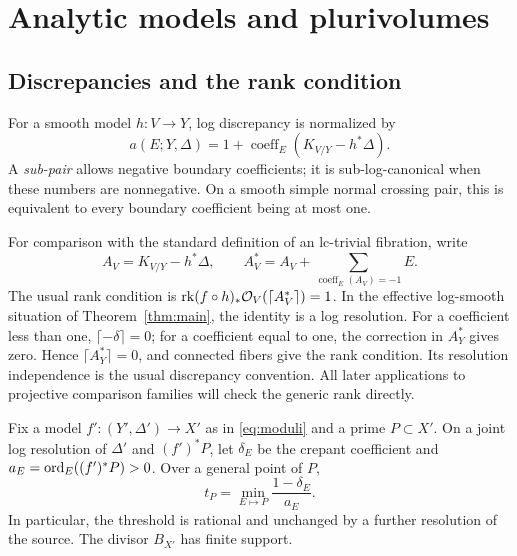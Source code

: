 \section{Analytic models and plurivolumes}\label{sec:prelim}

\subsection{Discrepancies and the rank condition}

For a smooth model \(h:V\to Y\), log discrepancy is normalized by
\[
 a(E;Y,\Delta)
 =1+\operatorname{coeff}_E(K_{V/Y}-h^*\Delta).
\]
A \emph{sub-pair} allows negative boundary coefficients; it is
sub-log-canonical when these numbers are nonnegative.
On a smooth simple normal crossing pair, this is equivalent to every
boundary coefficient being at most one.

For comparison with the standard definition of an lc-trivial
fibration, write
\[
 A_V=K_{V/Y}-h^*\Delta,\qquad
 A_V^*=A_V+\sum_{\operatorname{coeff}_E(A_V)=-1}E.
\]
The usual rank condition is
\(\operatorname{rk}(f\circ h)_*\mathcal O_V(\lceil A_V^*\rceil)=1\).
In the effective log-smooth situation of
Theorem~\ref{thm:main}, the identity is a log resolution.
For a coefficient less than one, \(\lceil-\delta\rceil=0\);
for a coefficient equal to one, the correction in \(A_Y^*\) gives
zero. Hence \(\lceil A_Y^*\rceil=0\), and connected fibers give the
rank condition. Its resolution independence is the usual
discrepancy convention. All later applications to projective
comparison families will check the generic rank directly.

\begin{lemma}\label{prelim:threshold}
Fix a model \(f':(Y',\Delta')\to X'\) as in
\eqref{eq:moduli} and a prime \(P\subset X'\).
On a joint log resolution of \(\Delta'\) and \((f')^*P\), let
\(\delta_E\) be the crepant coefficient and
\(a_E=\operatorname{ord}_E((f')^*P)>0\). Over a general point of \(P\),
\[
 t_P=\min_{E\mapsto P}\frac{1-\delta_E}{a_E}.
\]
In particular, the threshold is rational and unchanged by a further
resolution of the source. The divisor \(B_{X'}\) has finite support.
\end{lemma}

